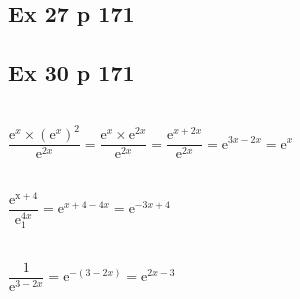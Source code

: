 \documentclass[12pt,a4paper]{book}
\begin{document}
\subsection*{Ex 27 p 171}


\subsection*{Ex 30 p 171}
\begin{enumMet}
    \item {}\\
    $\dfrac{\mathrm{e}^{x} \times\left(\mathrm{e}^{x}\right)^{2}}{\mathrm{e}^{2 x}}=\dfrac{\mathrm{e}^{x} \times \mathrm{e}^{2 x}}{\mathrm{e}^{2 x}}=\dfrac{\mathrm{e}^{x+2 x}}{\mathrm{e}^{2 x}}=\mathrm{e}^{3 x-2 x}=\mathrm{e}^{x}$
    \item {}\\
    $\dfrac{\mathrm{e}^{\mathrm{x}+4}}{\mathrm{e}_{1}^{4 x}}=\mathrm{e}^{x+4-4 x}=\mathrm{e}^{-3 x+4}$
    \item {}\\
    $\dfrac{1}{\mathrm{e}^{3-2 x}}=\mathrm{e}^{-(3-2 x)}=\mathrm{e}^{2 x-3}$
\end{enumMet}
\end{document}

